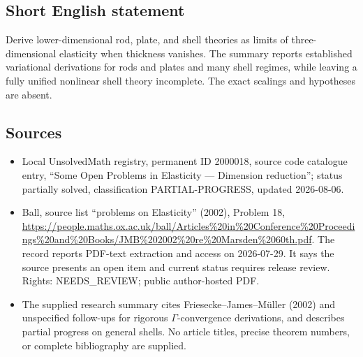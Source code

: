 \documentclass[11pt]{article}
\begin{document}
\subsection{Short English statement}
Derive lower-dimensional rod, plate, and shell theories as limits of three-dimensional elasticity when thickness vanishes. The summary reports established variational derivations for rods and plates and many shell regimes, while leaving a fully unified nonlinear shell theory incomplete. The exact scalings and hypotheses are absent.
\subsection{Sources}
\begin{itemize}
\item Local UnsolvedMath registry, permanent ID 2000018, source code catalogue entry, ``Some Open Problems in Elasticity --- Dimension reduction''; status partially solved, classification PARTIAL-PROGRESS, updated 2026-08-06.
\item Ball, source list ``problems on Elasticity'' (2002), Problem 18, \url{https://people.maths.ox.ac.uk/ball/Articles%20in%20Conference%20Proceedings%20and%20Books/JMB%202002%20re%20Marsden%2060th.pdf}. The record reports PDF-text extraction and access on 2026-07-29. It says the source presents an open item and current status requires release review. Rights: NEEDS\_REVIEW; public author-hosted PDF.
\item The supplied research summary cites Friesecke--James--M\"uller (2002) and unspecified follow-ups for rigorous $\Gamma$-convergence derivations, and describes partial progress on general shells. No article titles, precise theorem numbers, or complete bibliography are supplied.
\end{itemize}
\end{document}
